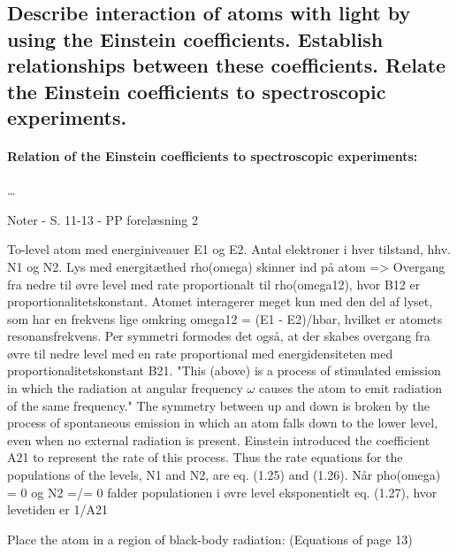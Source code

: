 \subsection{Describe interaction of atoms with light by using the Einstein coefficients. Establish relationships between these coefficients. Relate the Einstein coefficients to spectroscopic experiments.}





\paragraph{Relation of the Einstein coefficients to spectroscopic experiments:} \ldots




Noter
- S. 11-13
- PP forelæsning 2

To-level atom med energiniveauer E1 og E2. Antal elektroner i hver tilstand, hhv. N1 og N2.
Lys med energitæthed rho(omega) skinner ind på atom => Overgang fra nedre til øvre level med rate proportionalt til rho(omega12), hvor B12 er proportionalitetskonstant. Atomet interagerer meget kun med den del af lyset, som har en frekvens lige omkring omega12 = (E1 - E2)/hbar, hvilket er atomets resonansfrekvens.
Per symmetri formodes det også, at der skabes overgang fra øvre til nedre level med en rate proportional med energidensiteten med proportionalitetskonstant B21.
"This (above) is a process of stimulated emission in which the radiation
at angular frequency $\omega$ causes the atom to emit radiation of the same
frequency."
The symmetry between up and down is broken by the process of spontaneous emission in which an atom falls down to the lower level, even when no external radiation is present. Einstein introduced the coefficient A21 to represent the rate of this process. Thus the rate equations for the populations of the levels, N1 and N2, are eq. (1.25) and (1.26).
Når pho(omega) = 0 og N2 =/= 0 falder populationen i øvre level eksponentielt eq. (1.27), hvor levetiden er 1/A21

Place the atom in a region of black-body radiation: (Equations of page 13)
